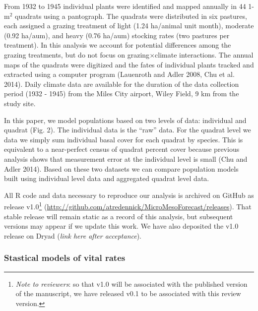 \documentclass[12pt,]{article}
\begin{document}
From 1932 to 1945 individual plants were identified and mapped annually
in 44 1-$\text{m}^2$ quadrats using a pantograph. The quadrats were
distributed in six pastures, each assigned a grazing treatment of light
(1.24 ha/animal unit month), moderate (0.92 ha/aum), and heavy (0.76
ha/aum) stocking rates (two pastures per treatment). In this analysis we
account for potential differences among the grazing treatments, but do
not focus on grazing$\times$climate interactions. The annual maps of the
quadrats were digitized and the fates of individual plants tracked and
extracted using a computer program (Lauenroth and Adler 2008, Chu et al.
2014). Daily climate data are available for the duration of the data
collection period (1932 - 1945) from the Miles City airport, Wiley
Field, 9 km from the study site.

In this paper, we model populations based on two levels of data:
individual and quadrat (Fig. 2). The individual data is the ``raw''
data. For the quadrat level we data we simply sum individual basal cover
for each quadrat by species. This is equivalent to a near-perfect census
of quadrat percent cover because previous analysis shows that
measurement error at the individual level is small (Chu and Adler 2014).
Based on these two datasets we can compare population models built using
individual level data and aggregated quadrat level data.

All R code and data necessary to reproduce our analysis is archived on
GitHub as release v1.0\footnote{\emph{Note to reviewers}: so that v1.0
  will be associated with the published version of the manuscript, we
  have released v0.1 to be associated with this review version.}
(\url{http://github.com/atredennick/MicroMesoForecast/releases}). That
stable release will remain static as a record of this analysis, but
subsequent versions may appear if we update this work. We have also
deposited the v1.0 release on Dryad (\emph{link here after acceptance}).

\subsubsection{Stastical models of vital
rates}\label{stastical-models-of-vital-rates}
\end{document}
